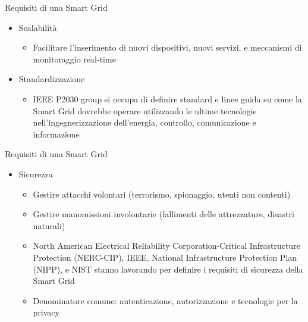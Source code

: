 \begin{frame}{Requisiti di una Smart Grid}
\begin{itemize}[<+- | alert@+>]
\item Scalabilità
	\begin{itemize}
		\item Facilitare l’inserimento di nuovi dispositivi, nuovi servizi, e meccanismi di monitoraggio real-time
	\end{itemize}
\item Standardizzazione
	\begin{itemize}
		\item IEEE P2030 group si occupa di definire standard e linee guida su come la Smart Grid dovrebbe operare utilizzando le ultime tecnologie nell’ingegnerizzazione dell’energia, controllo, comunicazione e informazione
	\end{itemize}
\end{itemize}
\end{frame}

\begin{frame}{Requisiti di una Smart Grid}
\begin{itemize}[<+- | alert@+>]
\item Sicurezza
	\begin{itemize}
		\item Gestire attacchi volontari (terrorismo, spionaggio, utenti non contenti)
		\item Gestire manomissioni involontarie (fallimenti delle attrezzature, disastri naturali)
		\item North American Electrical Reliability Corporation-Critical Infrastructure Protection (NERC-CIP), IEEE, National Infrastructure Protection Plan (NIPP), e NIST stanno lavorando per definire i requisiti di sicurezza della Smart Grid
		\item Denominatore comune: autenticazione, autorizzazione e tecnologie per la privacy
	\end{itemize}
\end{itemize}
\end{frame}